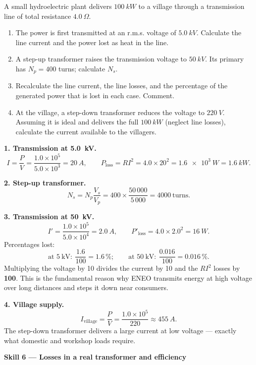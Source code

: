 \documentclass[11pt]{article}
\begin{document}
\begin{exoresolu}
A small hydroelectric plant delivers $\SI{100}{kW}$ to a village through a transmission line of total resistance $\SI{4.0}{\Omega}$.
\begin{enumerate}
\item The power is first transmitted at an r.m.s. voltage of $\SI{5.0}{kV}$. Calculate the line current and the power lost as heat in the line.
\item A step-up transformer raises the transmission voltage to $\SI{50}{kV}$. Its primary has $N_p = 400$ turns; calculate $N_s$.
\item Recalculate the line current, the line losses, and the percentage of the generated power that is lost in each case. Comment.
\item At the village, a step-down transformer reduces the voltage to $\SI{220}{V}$. Assuming it is ideal and delivers the full $\SI{100}{kW}$ (neglect line losses), calculate the current available to the villagers.
\end{enumerate}
\tcblower
\textbf{1. Transmission at \SI{5.0}{kV}.}
\[
I = \frac{P}{V} = \frac{1.0\times10^{5}}{5.0\times10^{3}} = \SI{20}{A}, \qquad
P_{\text{loss}} = RI^2 = 4.0 \times 20^2 = \SI{1.6e3}{W} = \SI{1.6}{kW}.
\]

\textbf{2. Step-up transformer.}
\[
N_s = N_p \frac{V_s}{V_p} = 400 \times \frac{50\,000}{5\,000} = 4000\ \text{turns}.
\]

\textbf{3. Transmission at \SI{50}{kV}.}
\[
I' = \frac{1.0\times10^{5}}{5.0\times10^{4}} = \SI{2.0}{A}, \qquad
P'_{\text{loss}} = 4.0 \times 2.0^2 = \SI{16}{W}.
\]
Percentages lost:
\[
\text{at } 5\ \mathrm{kV}:\ \frac{1.6}{100} = 1.6\,\%; \qquad
\text{at } 50\ \mathrm{kV}:\ \frac{0.016}{100} = 0.016\,\%.
\]
Multiplying the voltage by 10 divides the current by 10 and the $RI^2$ losses by \textbf{100}. This is the fundamental reason why ENEO transmits energy at high voltage over long distances and steps it down near consumers.

\textbf{4. Village supply.}
\[
I_{\text{village}} = \frac{P}{V} = \frac{1.0\times10^{5}}{220} \approx \SI{455}{A}.
\]
The step-down transformer delivers a large current at low voltage --- exactly what domestic and workshop loads require.
\end{exoresolu}

\textbf{Skill 6 --- Losses in a real transformer and efficiency}\par
\end{document}
